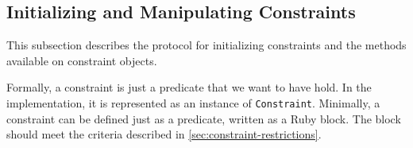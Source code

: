 

\subsection{Initializing and Manipulating Constraints}
\label{sec:initializing-constraints}

This subsection describes the protocol for initializing constraints
and the methods available on constraint objects.

Formally, a constraint is just a predicate that we want to have hold.
In the implementation, it is represented as an instance of
\lstinline{Constraint}.  Minimally, a constraint can be defined just
as a predicate, written as a Ruby block.  The block should meet the
criteria described in
\autoref{sec:constraint-restrictions}.

